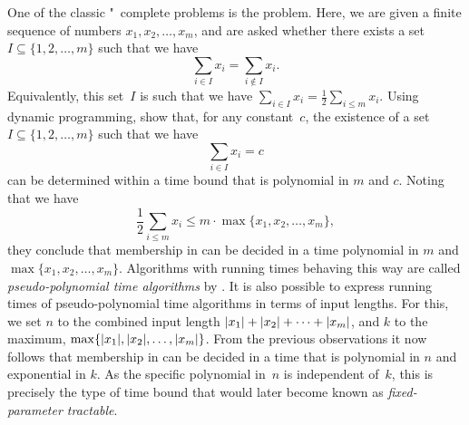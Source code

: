 \subsubsection{\citeauthor{garey1979computers}}
One of the classic "~complete problems is the  problem.
Here, we are given a finite sequence of numbers $x_1, x_2, \ldots, x_m$, and are asked whether there exists a set $I \subseteq \{1, 2, \ldots, m\}$ such that we have
\begin{equation*}
  \sum_{i \in I} x_i = \sum_{i \notin I} x_i.
\end{equation*}
Equivalently, this set~$I$ is such that we have $\sum_{i \in I} x_i = \frac{1}{2} \sum_{i \le m} x_i$.
Using dynamic programming, \textcite[Section~4.2]{garey1979computers} show that, for any constant~$c$, the existence of a set $I \subseteq \{1, 2, \ldots, m\}$ such that we have
\begin{equation*}
  \sum_{i \in I} x_i = c
\end{equation*}
can be determined within a time bound that is polynomial in $m$ and $c$.
Noting that we have
\begin{equation*}
  \frac{1}{2} \sum_{i \le m} x_i \le m \cdot \max \{x_1, x_2, \ldots, x_m\},
\end{equation*}
they conclude that membership in  can be decided in a time polynomial in $m$ and $\max \{x_1, x_2, \ldots, x_m\}$.
Algorithms with running times behaving this way are called \emph{pseudo-polynomial time algorithms} by \citeauthor{garey1979computers}.
It is also possible to express running times of pseudo-polynomial time algorithms in terms of input lengths.
For this, we set $n$ to the combined input length ${\lvert x_1\rvert} + {\lvert x_2\rvert} + \cdots + {\lvert x_m\rvert}$, and $k$ to the maximum, $\max \{{\lvert x_1\rvert}, {\lvert x_2\rvert}, \ldots, {\lvert x_m\rvert}\}$.
From the previous observations it now follows that membership in  can be decided in a time that is polynomial in $n$ and exponential in $k$.
As the specific polynomial in~$n$ is independent of~$k$, this is precisely the type of time bound that would later become known as \emph{fixed-parameter tractable}.

